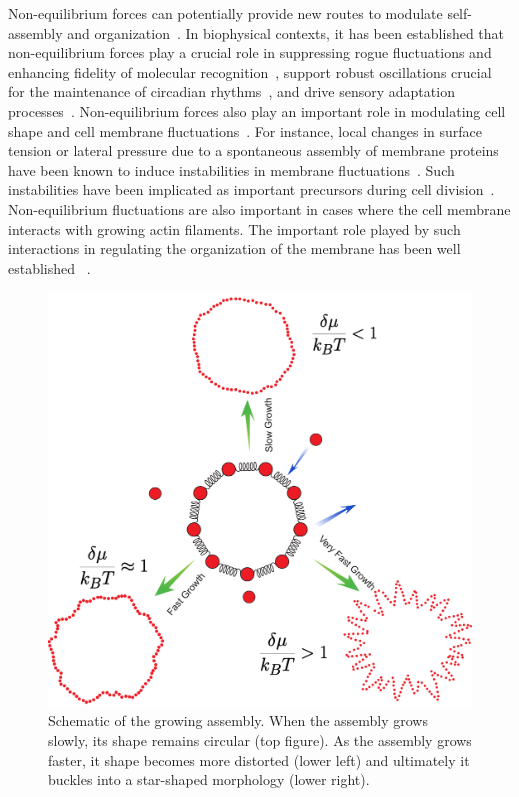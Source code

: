 \documentclass[amsmath,preprintnumbers,10pt,nofootinbib,prl,twocolumn]{revtex4-1}
\begin{document}
Non-equilibrium forces can potentially provide new routes to modulate self-assembly and organization~\cite{Battle604,Lan2012,Mehta2012,Whitelam2014}. In biophysical contexts, it has been established that non-equilibrium forces play a crucial role in suppressing rogue fluctuations and enhancing fidelity of molecular recognition~\cite{Hopfield1974,Mehta2012,Murugan2012,Murugan2016,Vaikunt2017}, support robust oscillations crucial for the maintenance of circadian rhythms~\cite{Barato2015}, and drive sensory adaptation processes~\cite{Lan2012,Mehta2012}. Non-equilibrium forces also play an important role in modulating cell shape and cell membrane fluctuations~\cite{McMahon2005, Turlier2016}. For instance, local changes in surface tension or lateral pressure due to a spontaneous assembly of membrane proteins have been known to induce instabilities in membrane fluctuations~\cite{Stachowiak2012, Chen2016,Rangamani2014,Leibler1986}. Such instabilities have been implicated as important precursors during cell division~\cite{McMahon2005}. Non-equilibrium fluctuations are also important in cases where the cell membrane interacts with growing actin filaments. The important role played by such interactions in regulating the organization of the membrane has been well established ~\cite{Gowrishankar2012,Weichsel2016}.
\begin{figure}[tbb]
\centering
\includegraphics[scale=0.35]{particleinaringschematicFig1.pdf}
\caption{Schematic of the growing assembly. When the assembly grows slowly, its shape remains circular (top figure). As the assembly grows faster, it shape becomes more distorted (lower left) and ultimately it buckles into a star-shaped morphology (lower right).} \label{fig:phases}
\end{figure}
\end{document}

